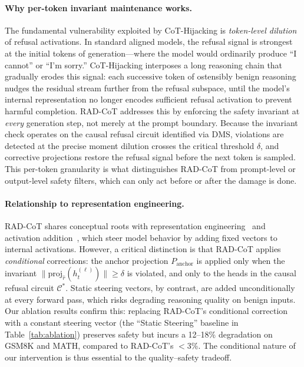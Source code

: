 \documentclass[11pt]{article}
\begin{document}
\paragraph{Why per-token invariant maintenance works.}
The fundamental vulnerability exploited by CoT-Hijacking is \emph{token-level dilution} of refusal activations. In standard aligned models, the refusal signal is strongest at the initial tokens of generation---where the model would ordinarily produce ``I cannot'' or ``I'm sorry.'' CoT-Hijacking interposes a long reasoning chain that gradually erodes this signal: each successive token of ostensibly benign reasoning nudges the residual stream further from the refusal subspace, until the model's internal representation no longer encodes sufficient refusal activation to prevent harmful completion. RAD-CoT addresses this by enforcing the safety invariant at \emph{every} generation step, not merely at the prompt boundary. Because the invariant check operates on the causal refusal circuit identified via DMS, violations are detected at the precise moment dilution crosses the critical threshold $\delta$, and corrective projections restore the refusal signal before the next token is sampled. This per-token granularity is what distinguishes RAD-CoT from prompt-level or output-level safety filters, which can only act before or after the damage is done.

\paragraph{Relationship to representation engineering.}
RAD-CoT shares conceptual roots with representation engineering~\citep{zou2023representation} and activation addition~\citep{turner2023activation}, which steer model behavior by adding fixed vectors to internal activations. However, a critical distinction is that RAD-CoT applies \emph{conditional} corrections: the anchor projection $P_{\mathrm{anchor}}$ is applied only when the invariant $\|\mathrm{proj}_{\hat{r}}(h_t^{(\ell)})\| \geq \delta$ is violated, and only to the heads in the causal refusal circuit $\mathcal{C}^*$. Static steering vectors, by contrast, are added unconditionally at every forward pass, which risks degrading reasoning quality on benign inputs. Our ablation results confirm this: replacing RAD-CoT's conditional correction with a constant steering vector (the ``Static Steering'' baseline in Table~\ref{tab:ablation}) preserves safety but incurs a 12--18\% degradation on GSM8K and MATH, compared to RAD-CoT's $<$3\%. The conditional nature of our intervention is thus essential to the quality--safety tradeoff.
\end{document}
